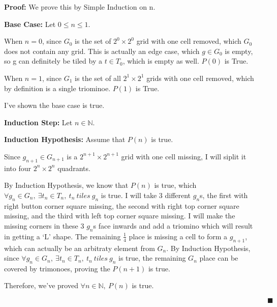 \documentclass[12pt]{article}
\begin{document}
\begin{enumerate}[label=(\alph*)]
    \textbf{Proof:} We prove this by Simple Induction on n.


    \textbf{Base Case:} Let $0 \leq n \leq 1$.

    When $n=0$,
    since $G_0$ is the set of $2^0 \times 2^0$ grid with one cell removed, which $G_0$ does not contain any grid.
    This is actually an edge case, which $g \in G_0$ is empty, so g can definitely be tiled by a $t \in T_0$, which is empty as well.
    $P(0)$ is True.

    When $n=1$,
    since $G_1$ is the set of all $2^1 \times 2^1$ grids with one cell removed, which by definition is a single triominoe.
    $P(1)$ is True.

    I've shown the base case is true.

    \textbf{Induction Step:} Let $n \in \mathbb{N}$.
    
    \textbf{Induction Hypothesis:} Assume that $P(n)$ is true.

    Since $g_{n+1} \in G_{n+1}$ is a $2^{n+1} \times 2^{n+1}$ grid with one cell missing, I will siplit it into four $2^n \times 2^n$ quadrants.
    
    By Induction Hypothesis, we know that $P(n)$ is true, which $\forall g_n \in G_n,\ \exists t_n \in T_n,\ t_n\ tiles\ g_n $ is true.
    I will take 3 different $g_n$s, the first with right button corner square missing, the second with right top corner square missing, and the third with left top corner square missing.
    I will make the missing corners in these 3 $g_n$s face inwards and add a triomino which will result in getting a `L' shape.
    The remaining $\frac{1}{4}$ place is missing a cell to form a $g_{n+1}$, which can actually be an arbitraty element from $G_n$.
    By Induction Hypothesis, since $\forall g_n \in G_n,\ \exists t_n \in T_n,\ t_n\ tiles\ g_n $ is true, the remaining $G_n$ place can be covered by trimonoes, proving the $P(n+1)$ is true.

    Therefore, we've proved $\forall n \in \mathbb{N},\ P(n)$ is true.

    $\quad \quad \quad \quad \quad \quad \quad \quad \quad \quad \quad \quad \quad \quad \quad \quad \quad \quad \quad \quad \quad \quad \quad \quad \quad \quad \quad \quad \quad \quad \quad \quad \quad \quad \quad \quad \quad \blacksquare $
\end{enumerate}


\end{document}

